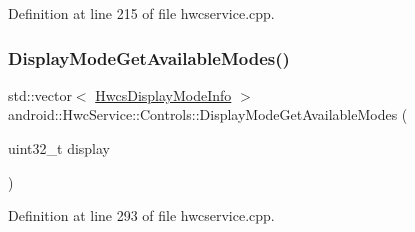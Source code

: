 Definition at line 215 of file hwcservice.\+cpp.


\begin{DoxyCode}{0}
\end{DoxyCode}
\mbox{\label{classandroid_1_1HwcService_1_1Controls_aae5310df10b584ddb537266bcb9399b5}} 
\subsubsection{\texorpdfstring{Display\+Mode\+Get\+Available\+Modes()}{DisplayModeGetAvailableModes()}}
{\footnotesize\ttfamily std\+::vector$<$ \mbox{\hyperlink{hwcserviceapi_8h_a6e13f5285374b86aab82ec0c0ba62d7a}{Hwcs\+Display\+Mode\+Info}} $>$ android\+::\+Hwc\+Service\+::\+Controls\+::\+Display\+Mode\+Get\+Available\+Modes (\begin{DoxyParamCaption}\item[{uint32\+\_\+t}]{display }\end{DoxyParamCaption})}



Definition at line 293 of file hwcservice.\+cpp.


